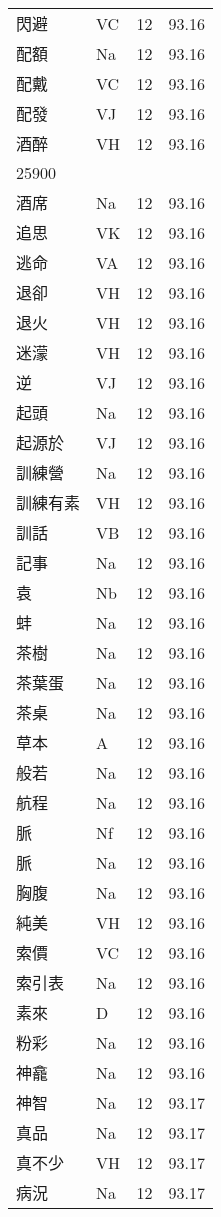 \documentclass[twocolumn]{book}
\begin{document}
\begin{supertabular}{llrr}
閃避 & VC & 12 &  93.16\\
配額 & Na & 12 &  93.16\\
配戴 & VC & 12 &  93.16\\
配發 & VJ & 12 &  93.16\\
酒醉 & VH & 12 &  93.16\\
25900\\
酒席 & Na & 12 &  93.16\\
追思 & VK & 12 &  93.16\\
逃命 & VA & 12 &  93.16\\
退卻 & VH & 12 &  93.16\\
退火 & VH & 12 &  93.16\\
迷濛 & VH & 12 &  93.16\\
逆 & VJ & 12 &  93.16\\
起頭 & Na & 12 &  93.16\\
起源於 & VJ & 12 &  93.16\\
訓練營 & Na & 12 &  93.16\\
訓練有素 & VH & 12 &  93.16\\
訓話 & VB & 12 &  93.16\\
記事 & Na & 12 &  93.16\\
袁 & Nb & 12 &  93.16\\
蚌 & Na & 12 &  93.16\\
茶樹 & Na & 12 &  93.16\\
茶葉蛋 & Na & 12 &  93.16\\
茶桌 & Na & 12 &  93.16\\
草本 & A & 12 &  93.16\\
般若 & Na & 12 &  93.16\\
航程 & Na & 12 &  93.16\\
脈 & Nf & 12 &  93.16\\
脈 & Na & 12 &  93.16\\
胸腹 & Na & 12 &  93.16\\
純美 & VH & 12 &  93.16\\
索價 & VC & 12 &  93.16\\
索引表 & Na & 12 &  93.16\\
素來 & D & 12 &  93.16\\
粉彩 & Na & 12 &  93.16\\
神龕 & Na & 12 &  93.16\\
神智 & Na & 12 &  93.17\\
真品 & Na & 12 &  93.17\\
真不少 & VH & 12 &  93.17\\
病況 & Na & 12 &  93.17\\

\end{supertabular}
\end{document}
